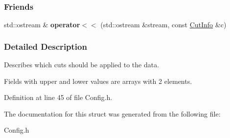 \subsubsection*{Friends}
\begin{DoxyCompactItemize}
\item 
\hypertarget{structCutInfo_a14e393f2eee5a528b1a82cf1a869d5aa}{
std::ostream \& {\bfseries operator$<$$<$} (std::ostream \&stream, const \hyperlink{structCutInfo}{CutInfo} \&c)}
\label{structCutInfo_a14e393f2eee5a528b1a82cf1a869d5aa}

\end{DoxyCompactItemize}


\subsubsection{Detailed Description}
Describes which cuts should be applied to the data. 

Fields with upper and lower values are arrays with 2 elements. 

Definition at line 45 of file Config.h.



The documentation for this struct was generated from the following file:\begin{DoxyCompactItemize}
\item 
Config.h\end{DoxyCompactItemize}
